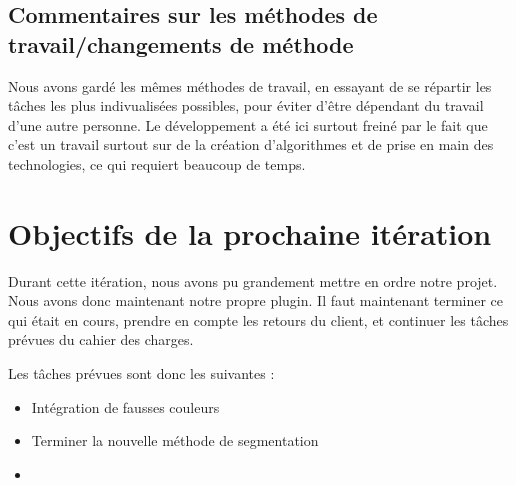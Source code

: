 \documentclass[12pt,titlepage,french]{article}
\begin{document}
\subsection{Commentaires sur les méthodes de travail/changements de méthode}

Nous avons gardé les mêmes méthodes de travail, en essayant de se répartir les tâches les plus indivualisées possibles, pour éviter d'être dépendant du travail d'une autre personne. Le développement a été ici surtout freiné par le fait que c'est un travail surtout sur de la création d'algorithmes et de prise en main des technologies, ce qui requiert beaucoup de temps.

\section{Objectifs de la prochaine itération}

Durant cette itération, nous avons pu grandement mettre en ordre notre projet. Nous avons donc maintenant notre propre plugin. Il faut maintenant terminer ce qui était en cours, prendre en compte les retours du client, et continuer les tâches prévues du cahier des charges.

Les tâches prévues sont donc les suivantes :

\begin{itemize}
  \item Intégration de fausses couleurs
  \item Terminer la nouvelle méthode de segmentation
  \item
\end{itemize}
\end{document}
